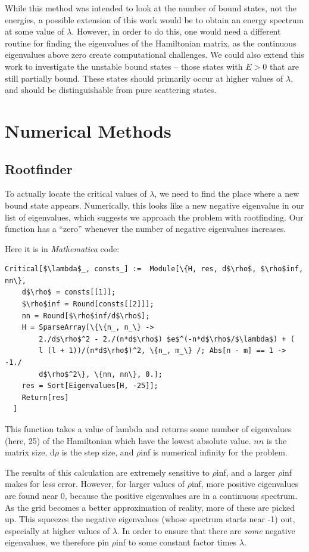 \documentclass[12pt,twoside]{reedthesis}
\begin{document}
While this method was intended to look at the number of bound states, not the energies, a possible extension of this work would be to obtain an energy spectrum at some value of $\lambda$. However, in order to do this, one would need a different routine for finding the eigenvalues of the Hamiltonian matrix, as the continuous eigenvalues above zero create computational challenges.
We could also extend this work to investigate the unstable bound states -- those states with $E > 0$ that are still partially bound. These states should primarily occur at higher values of $\lambda$, and should be distinguishable from pure scattering states. 


%
\appendix
\chapter{Numerical Methods}

\section{Rootfinder}

To actually locate the critical values of $\lambda$, we need to find the place where a new bound state appears. Numerically, this looks like a new negative eigenvalue in our list of eigenvalues, which suggests we approach the problem with rootfinding. Our function has a ``zero'' whenever the number of negative eigenvalues increases.

Here it is in \emph{Mathematica} code:
\begin{Verbatim}[commandchars=\\\{\}, codes={\catcode`$=3}]
Critical[$\lambda$_, consts_] :=  Module[\{H, res, d$\rho$, $\rho$inf, nn\},
    d$\rho$ = consts[[1]];
    $\rho$inf = Round[consts[[2]]];
    nn = Round[$\rho$inf/d$\rho$];
    H = SparseArray[\{\{n_, n_\} -> 
        2./d$\rho$^2 - 2./(n*d$\rho$) $e$^(-n*d$\rho$/$\lambda$) + (
        l (l + 1))/(n*d$\rho$)^2, \{n_, m_\} /; Abs[n - m] == 1 -> -1./
        d$\rho$^2\}, \{nn, nn\}, 0.];
    res = Sort[Eigenvalues[H, -25]];
    Return[res]
  ]
\end{Verbatim}
This function takes a value of lambda and returns some number of eigenvalues (here, 25)  of the Hamiltonian which have the lowest absolute value. $nn$ is the matrix size, d$\rho$ is the step size, and $\rho$inf is numerical infinity for the problem.

The results of this calculation are extremely sensitive to $\rho$inf, and a larger $\rho$inf makes for less error. However, for larger values of $\rho$inf, more positive eigenvalues are found near 0, because the positive eigenvalues are in a continuous spectrum. As the grid becomes a better approximation of reality, more of these are picked up. This squeezes the negative eigenvalues (whose spectrum starts near -1) out, especially at higher values of $\lambda$. In order to ensure that there are \emph{some} negative eigenvalues, we therefore pin $\rho$inf to some constant factor times $\lambda$. 
\end{document}
